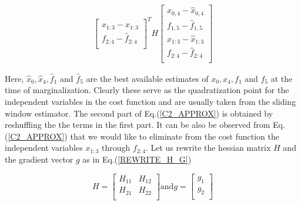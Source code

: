 \begin{equation}
\begin{split}
\begin{bmatrix}
																								x_{1:3} - \hat x_{1:3}\\ 
                                                f_{2:4} - \hat f_{2:4}\\
									              \end{bmatrix}^T H 
												\begin{bmatrix} x_{0,4} - \hat x_{0,4}\\ 
                                        f_{1,5} - \hat f_{1,5}\\
																				x_{1:3} - \hat x_{1:3}\\ 
                                        f_{2:4} - \hat f_{2:4}\\
									      \end{bmatrix} 
\label{C2_APPROX}
\end{split}
\end{equation}

Here, $\hat x_0, \hat x_4, \hat f_1$ and $\hat f_5$ are the best available estimates of $x_0, x_4, f_1$ and $f_5$ at the time of marginalization. Clearly these serve as the quadratization point for the independent variables in the cost function and are usually taken from the sliding window estimator. The second part of Eq.(\ref{C2_APPROX}) is obtained by reshuffling the the terms in the first part. It can be also be observed from Eq.(\ref{C2_APPROX}) that we would like to eliminate from the cost function the independent variables $x_{1:3}$ through $f_{2:4}$. Let us rewrite the hessian matrix $H$ and the gradient vector $g$ as in Eq.(\ref{REWRITE_H_G})

\begin{subequations}
\begin{equation}
H = \begin{bmatrix} 
			H_{11} & H_{12} \\
			H_{21} & H_{22} \\
		\end{bmatrix} 
\end{equation}
\text{and}

\begin{equation}
g = \begin{bmatrix} 
			g_{1} \\
			g_{2} \\
		\end{bmatrix}
\end{equation}
\label{REWRITE_H_G}
\end{subequations}

